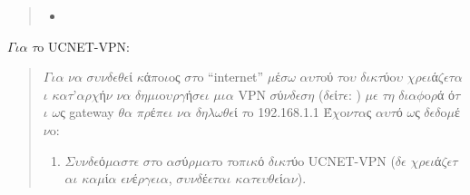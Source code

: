 \documentclass[a4paper,11pt,english]{sphinxmanual}
\begin{document}
\begin{quote}
\begin{itemize}
\item {} 

\end{itemize}
\end{quote}

\(\Gamma\)\(\iota\)\(\alpha\) \(\tau\)o UCNET-VPN:
\begin{quote}

\(\Gamma\)\(\iota\)\(\alpha\) \(\nu\)\(\alpha\) \(\sigma\)\(\upsilon\)\(\nu\)\(\delta\)\(\epsilon\)\(\theta\)\(\epsilon\)ί \(\kappa\)ά\(\pi\)o\(\iota\)oς \(\sigma\)\(\tau\)o “internet” \(\mu\)έ\(\sigma\)\(\omega\) \(\alpha\)\(\upsilon\)\(\tau\)oύ \(\tau\)o\(\upsilon\) \(\delta\)\(\iota\)\(\kappa\)\(\tau\)ύo\(\upsilon\) \(\chi\)\(\rho\)\(\epsilon\)\(\iota\)ά\(\zeta\)\(\epsilon\)\(\tau\)\(\alpha\)\(\iota\) \(\kappa\)\(\alpha\)\(\tau\)’\(\alpha\)\(\rho\)\(\chi\)ή\(\nu\) \(\nu\)\(\alpha\) \(\delta\)\(\eta\)\(\mu\)\(\iota\)o\(\upsilon\)\(\rho\)\(\gamma\)ή\(\sigma\)\(\epsilon\)\(\iota\) \(\mu\)\(\iota\)\(\alpha\) VPN \(\sigma\)ύ\(\nu\)\(\delta\)\(\epsilon\)\(\sigma\)\(\eta\) (\(\delta\)\(\epsilon\)ί\(\tau\)\(\epsilon\): {\hyperref[\detokenize{HowToVPN::doc}]{}}) \(\mu\)\(\epsilon\) \(\tau\)\(\eta\) \(\delta\)\(\iota\)\(\alpha\)\(\phi\)o\(\rho\)ά ό\(\tau\)\(\iota\) \(\omega\)ς gateway \(\theta\)\(\alpha\) \(\pi\)\(\rho\)έ\(\pi\)\(\epsilon\)\(\iota\) \(\nu\)\(\alpha\) \(\delta\)\(\eta\)\(\lambda\)\(\omega\)\(\theta\)\(\epsilon\)ί \(\tau\)o 192.168.1.1
Έ\(\chi\)o\(\nu\)\(\tau\)\(\alpha\)ς \(\alpha\)\(\upsilon\)\(\tau\)ό \(\omega\)ς \(\delta\)\(\epsilon\)\(\delta\)o\(\mu\)έ\(\nu\)o:
\begin{enumerate}
\item {} 
\(\Sigma\)\(\upsilon\)\(\nu\)\(\delta\)\(\epsilon\)ό\(\mu\)\(\alpha\)\(\sigma\)\(\tau\)\(\epsilon\) \(\sigma\)\(\tau\)o \(\alpha\)\(\sigma\)ύ\(\rho\)\(\mu\)\(\alpha\)\(\tau\)o \(\tau\)o\(\pi\)\(\iota\)\(\kappa\)ό \(\delta\)\(\iota\)\(\kappa\)\(\tau\)ύo UCNET-VPN (\(\delta\)\(\epsilon\) \(\chi\)\(\rho\)\(\epsilon\)\(\iota\)ά\(\zeta\)\(\epsilon\)\(\tau\)\(\alpha\)\(\iota\) \(\kappa\)\(\alpha\)\(\mu\)ί\(\alpha\) \(\epsilon\)\(\nu\)έ\(\rho\)\(\gamma\)\(\epsilon\)\(\iota\)\(\alpha\), \(\sigma\)\(\upsilon\)\(\nu\)\(\delta\)έ\(\epsilon\)\(\tau\)\(\alpha\)\(\iota\) \(\kappa\)\(\alpha\)\(\tau\)\(\epsilon\)\(\upsilon\)\(\theta\)\(\epsilon\)ί\(\alpha\)\(\nu\)).


\end{enumerate}
\end{quote}
\end{document}
